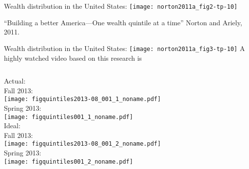 \begin{frame}

  \begin{block}{\small Wealth distribution in the United States:\cite{norton2011a}}
    \texttt{[image: norton2011a\_fig2-tp-10]}
  \end{block}
  \small
  ``Building a better America---One wealth quintile at a time''\newline
  Norton and Ariely, 2011.\cite{norton2011a}
  
\end{frame}

\begin{frame}

  \begin{block}{\small Wealth distribution in the United States:\cite{norton2011a}}
    \texttt{[image: norton2011a\_fig3-tp-10]}
    \small
    \small
    A highly watched video based on this research is
  \end{block}
  
\end{frame}

\begin{frame}

  \begin{columns}
    Actual:\\
    {\small Fall 2013:}\\
    \texttt{[image: figquintiles2013-08\_001\_1\_noname.pdf]}\\
    {\small Spring 2013:}\\
    \texttt{[image: figquintiles001\_1\_noname.pdf]}\\
    Ideal:\\
    {\small Fall 2013:}\\
    \texttt{[image: figquintiles2013-08\_001\_2\_noname.pdf]}\\
    {\small Spring 2013:}\\
    \texttt{[image: figquintiles001\_2\_noname.pdf]}\\
  \end{columns}

\end{frame}



